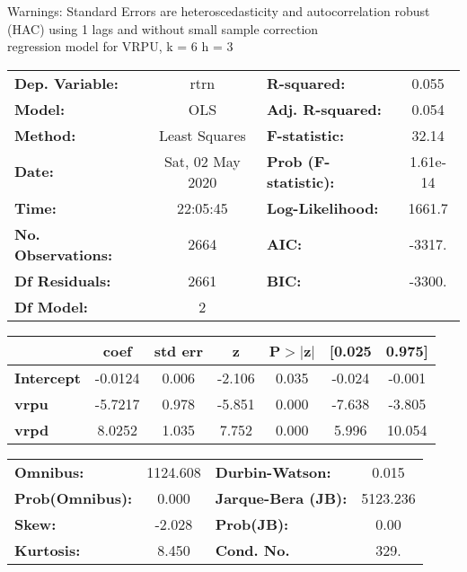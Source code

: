 Warnings: \newline
 [1] Standard Errors are heteroscedasticity and autocorrelation robust (HAC) using 1 lags and without small sample correction\\ 

regression model for VRPU, k = 6 h = 3\begin{center}
\begin{tabular}{lclc}
\toprule
\textbf{Dep. Variable:}    &       rtrn       & \textbf{  R-squared:         } &     0.055   \\
\textbf{Model:}            &       OLS        & \textbf{  Adj. R-squared:    } &     0.054   \\
\textbf{Method:}           &  Least Squares   & \textbf{  F-statistic:       } &     32.14   \\
\textbf{Date:}             & Sat, 02 May 2020 & \textbf{  Prob (F-statistic):} &  1.61e-14   \\
\textbf{Time:}             &     22:05:45     & \textbf{  Log-Likelihood:    } &    1661.7   \\
\textbf{No. Observations:} &        2664      & \textbf{  AIC:               } &    -3317.   \\
\textbf{Df Residuals:}     &        2661      & \textbf{  BIC:               } &    -3300.   \\
\textbf{Df Model:}         &           2      & \textbf{                     } &             \\
\bottomrule
\end{tabular}
\begin{tabular}{lcccccc}
                   & \textbf{coef} & \textbf{std err} & \textbf{z} & \textbf{P$> |$z$|$} & \textbf{[0.025} & \textbf{0.975]}  \\
\midrule
\textbf{Intercept} &      -0.0124  &        0.006     &    -2.106  &         0.035        &       -0.024    &       -0.001     \\
\textbf{vrpu}      &      -5.7217  &        0.978     &    -5.851  &         0.000        &       -7.638    &       -3.805     \\
\textbf{vrpd}      &       8.0252  &        1.035     &     7.752  &         0.000        &        5.996    &       10.054     \\
\bottomrule
\end{tabular}
\begin{tabular}{lclc}
\textbf{Omnibus:}       & 1124.608 & \textbf{  Durbin-Watson:     } &    0.015  \\
\textbf{Prob(Omnibus):} &   0.000  & \textbf{  Jarque-Bera (JB):  } & 5123.236  \\
\textbf{Skew:}          &  -2.028  & \textbf{  Prob(JB):          } &     0.00  \\
\textbf{Kurtosis:}      &   8.450  & \textbf{  Cond. No.          } &     329.  \\
\bottomrule
\end{tabular}
\end{center}

